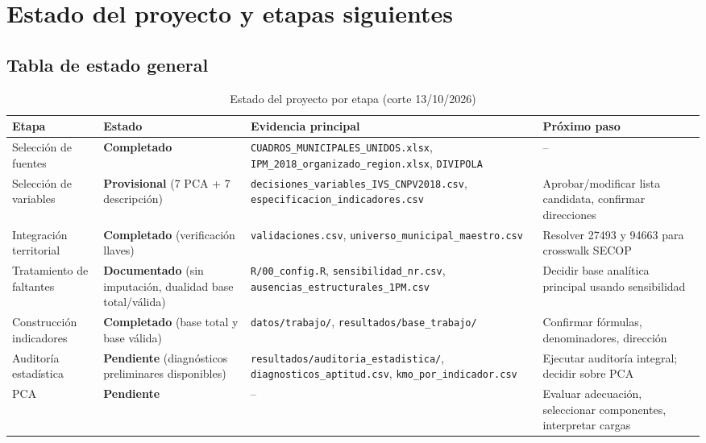 \section{Estado del proyecto y etapas siguientes}
\label{ch:estado_proyecto}
\label{sec:estado_proyecto}

\subsection{Tabla de estado general}
\label{sec:estado_general}

\begin{table}[htbp]
\centering
\caption{Estado del proyecto por etapa (corte 13/10/2026)}
\label{tab:estado_proyecto}
\begin{adjustbox}{max width=\textwidth}
\begin{tabular}{@{}llll@{}}
\toprule
\textbf{Etapa} & \textbf{Estado} & \textbf{Evidencia principal} & \textbf{Próximo paso} \\
\midrule
Selección de fuentes & \textbf{Completado} & \texttt{CUADROS\_MUNICIPALES\_UNIDOS.xlsx}, \texttt{IPM\_2018\_organizado\_region.xlsx}, \texttt{DIVIPOLA} & -- \\
Selección de variables & \textbf{Provisional} (7 PCA + 7 descripción) & \texttt{decisiones\_variables\_IVS\_CNPV2018.csv}, \texttt{especificacion\_indicadores.csv} & Aprobar/modificar lista candidata, confirmar direcciones \\
Integración territorial & \textbf{Completado} (verificación llaves) & \texttt{validaciones.csv}, \texttt{universo\_municipal\_maestro.csv} & Resolver 27493 y 94663 para crosswalk SECOP \\
Tratamiento de faltantes & \textbf{Documentado} (sin imputación, dualidad base total/válida) & \texttt{R/00\_config.R}, \texttt{sensibilidad\_nr.csv}, \texttt{ausencias\_estructurales\_1PM.csv} & Decidir base analítica principal usando sensibilidad \\
Construcción indicadores & \textbf{Completado} (base total y base válida) & \texttt{datos/trabajo/}, \texttt{resultados/base\_trabajo/} & Confirmar fórmulas, denominadores, dirección \\
Auditoría estadística & \textbf{Pendiente} (diagnósticos preliminares disponibles) & \texttt{resultados/auditoria\_estadistica/}, \texttt{diagnosticos\_aptitud.csv}, \texttt{kmo\_por\_indicador.csv} & Ejecutar auditoría integral; decidir sobre PCA \\
PCA & \textbf{Pendiente} & -- & Evaluar adecuación, seleccionar componentes, interpretar cargas \\

\end{tabular}
\end{adjustbox}
\end{table}
